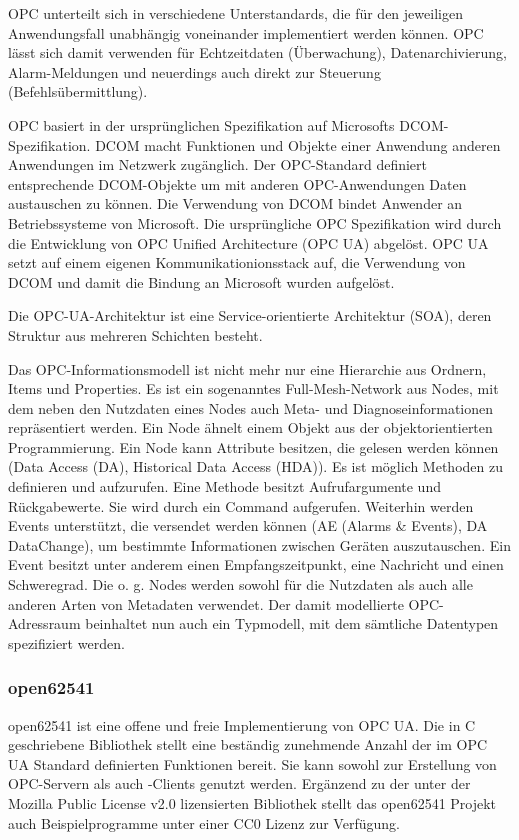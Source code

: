 OPC unterteilt sich in verschiedene Unterstandards, die für den jeweiligen Anwendungsfall
unabhängig voneinander implementiert werden können. OPC lässt sich damit verwenden
für Echtzeitdaten (Überwachung), Datenarchivierung, Alarm-Meldungen und neuerdings
auch direkt zur Steuerung (Befehlsübermittlung).\grqq{}

OPC basiert in der ursprünglichen Spezifikation auf Microsofts DCOM-Spezifikation.
DCOM macht Funktionen und Objekte einer Anwendung anderen Anwendungen im Netzwerk
zugänglich. Der OPC-Standard definiert entsprechende DCOM-Objekte um mit anderen
OPC-Anwendungen Daten austauschen zu können. Die Verwendung von DCOM bindet Anwender
an Betriebssysteme von Microsoft. Die ursprüngliche OPC Spezifikation wird durch die
Entwicklung von OPC Unified Architecture (OPC UA) abgelöst.
OPC UA setzt auf einem eigenen Kommunikationionsstack auf, die Verwendung von DCOM
und damit die Bindung an Microsoft wurden aufgelöst.

Die OPC-UA-Architektur ist eine Service-orientierte Architektur (SOA), deren Struktur
aus mehreren Schichten besteht.

Das OPC-Informationsmodell ist nicht mehr nur eine Hierarchie aus Ordnern, Items
und Properties. Es ist ein sogenanntes Full-Mesh-Network aus Nodes, mit dem neben
den Nutzdaten eines Nodes auch Meta- und Diagnoseinformationen repräsentiert werden.
Ein Node ähnelt einem Objekt aus der objektorientierten Programmierung. Ein Node
kann Attribute besitzen, die gelesen werden können (Data Access (DA), Historical
Data Access (HDA)). Es ist möglich Methoden zu definieren und aufzurufen.
Eine Methode besitzt Aufrufargumente und Rückgabewerte. Sie wird durch ein Command
aufgerufen. Weiterhin werden Events unterstützt, die versendet werden können
(AE (Alarms \& Events), DA DataChange), um bestimmte Informationen zwischen Geräten
auszutauschen. Ein Event besitzt unter anderem einen Empfangszeitpunkt, eine Nachricht
und einen Schweregrad. Die o. g. Nodes werden sowohl für die Nutzdaten als auch
alle anderen Arten von Metadaten verwendet. Der damit modellierte OPC-Adressraum
beinhaltet nun auch ein Typmodell, mit dem sämtliche Datentypen spezifiziert werden.

\subsubsection{open62541%
        \label{sec:2-open62541}}
open62541 ist eine offene und freie Implementierung von OPC UA. Die in C geschriebene
Bibliothek stellt eine beständig zunehmende Anzahl der im OPC UA Standard definierten
Funktionen bereit. Sie kann sowohl zur Erstellung von OPC-Servern als auch -Clients
genutzt werden. Ergänzend zu der unter der Mozilla Public License v2.0 lizensierten
Bibliothek stellt das open62541 Projekt auch Beispielprogramme unter einer CC0 Lizenz
zur Verfügung.

